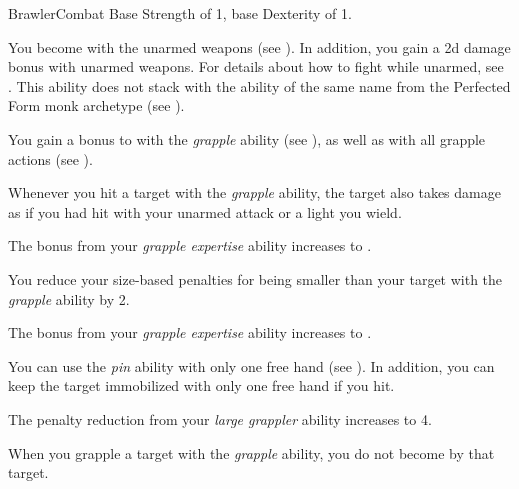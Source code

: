     \begin{feat}{Brawler}{Combat}
        \featpre Base Strength of 1, base Dexterity of 1.

         You become  with the unarmed weapons  (see ).
        In addition, you gain a \plus2d damage bonus with unarmed weapons.
        For details about how to fight while unarmed, see .
        This ability does not stack with the ability of the same name from the Perfected Form monk archetype (see ).

         You gain a  bonus to  with the \textit{grapple} ability (see ), as well as with all grapple actions (see ).

         Whenever you hit a target with the \textit{grapple} ability, the target also takes damage as if you had hit with your unarmed attack or a light  you wield.

         The bonus from your \textit{grapple expertise} ability increases to .

         You reduce your size-based penalties for being smaller than your target with the \textit{grapple} ability by 2.

         The bonus from your \textit{grapple expertise} ability increases to .

         You can use the \textit{pin} ability with only one free hand (see ).
        In addition, you can keep the target immobilized with only one free hand if you hit.

         The penalty reduction from your \textit{large grappler} ability increases to 4.

         When you grapple a target with the \textit{grapple} ability, you do not become \grappled by that target.
    \end{feat}

